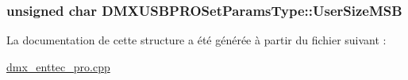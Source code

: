 \hypertarget{struct_d_m_x_u_s_b_p_r_o_set_params_type_adae7671559ec6924d03fd27f50d6fda0}{
\subsubsection[{User\+Size\+M\+S\+B}]{\setlength{\rightskip}{0pt plus 5cm}unsigned char D\+M\+X\+U\+S\+B\+P\+R\+O\+Set\+Params\+Type\+::\+User\+Size\+M\+S\+B}}\label{struct_d_m_x_u_s_b_p_r_o_set_params_type_adae7671559ec6924d03fd27f50d6fda0}


La documentation de cette structure a été générée à partir du fichier suivant \+:\begin{DoxyCompactItemize}
\item 
\hyperlink{dmx__enttec__pro_8cpp}{dmx\+\_\+enttec\+\_\+pro.\+cpp}\end{DoxyCompactItemize}

